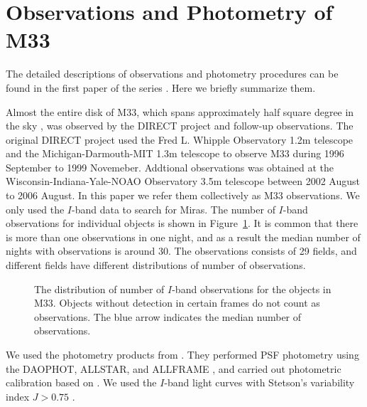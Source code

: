\section{Observations and Photometry of M33} \label{sec.observations}

The detailed descriptions of observations and photometry procedures can be found in the first paper of the series \citep{2011ApJS..193...26P}. Here we briefly summarize them.

Almost the entire disk of M33, which spans approximately half square degree in the sky \citep{1895MNRAS..56...70R}, was observed by the DIRECT project and follow-up observations. The original DIRECT project used the Fred L. Whipple Observatory 1.2m telescope and the Michigan-Darmouth-MIT 1.3m telescope to observe M33 during 1996 September to 1999 Novemeber. Addtional observations was obtained at the Wisconsin-Indiana-Yale-NOAO Observatory 3.5m telescope between 2002 August to 2006 August. In this paper we refer them collectively as M33 observations. We only used the $I$-band data to search for Miras. The number of $I$-band observations for individual objects is shown in Figure~\ref{fig.n_obs}. It is common that there is more than one observations in one night, and as a result the median number of nights with observations is around 30. The observations consists of 29 fields, and different fields have different distributions of number of observations.

\begin{figure}
\caption{The distribution of number of $I$-band observations for the objects in M33. Objects without detection in certain frames do not count as observations. The blue arrow indicates the median number of observations.}\label{fig.n_obs}
\end{figure}

We used the photometry products from \cite{2011ApJS..193...26P}. They performed PSF photometry using the DAOPHOT, ALLSTAR, and ALLFRAME \citep{1987PASP...99..191S,1994PASP..106..250S}, and carried out photometric calibration based on \cite{2006AJ....131.2478M}. We used the $I$-band light curves with Stetson's variability index $J>0.75$ \citep{1996PASP..108..851S}.

